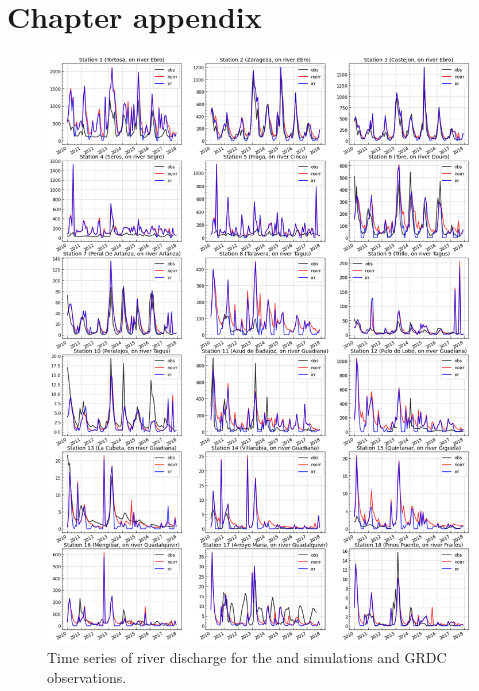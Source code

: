 \clearpage

\section{Chapter appendix} %
\begin{figure}[htbp]
    \centering
    \includegraphics[width=\textwidth]{images/chap4/18_stations_TS.png}
    \caption{Time series of river discharge for the \irr and \noirr simulations and GRDC observations.}
\end{figure}

